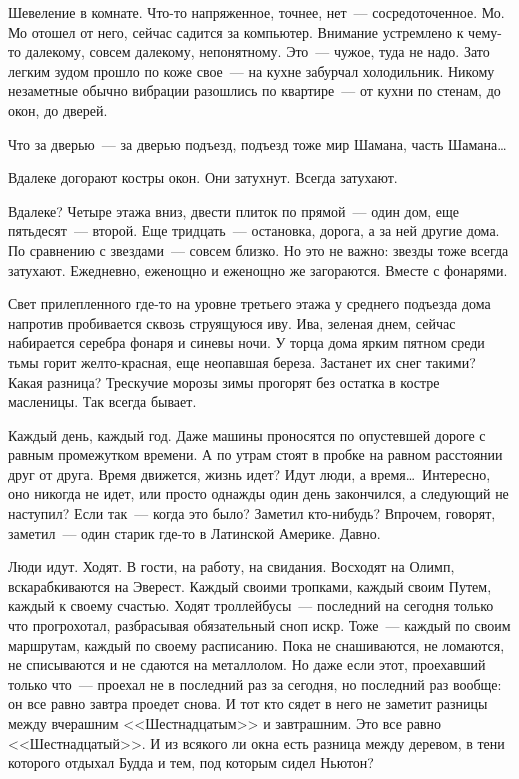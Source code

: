 Шевеление в комнате. Что-то напряженное, точнее, нет~--- сосредоточенное. Мо. 
Мо отошел от него, сейчас садится за компьютер. Внимание устремлено к чему-то 
далекому, совсем далекому, непонятному. Это~--- чужое, туда не надо. Зато 
легким зудом прошло по коже свое~--- на кухне забурчал холодильник. Никому незаметные 
обычно вибрации разошлись по квартире~--- от кухни по стенам, до окон, до 
дверей. 

Что за дверью~--- за дверью подъезд, подъезд тоже мир Шамана, часть Шамана\ldots

\newpage

Вдалеке догорают костры окон. Они затухнут. Всегда затухают.

Вдалеке? Четыре этажа вниз, двести плиток по прямой~--- один дом, еще 
пятьдесят~--- второй. Еще тридцать~--- остановка, дорога, а за ней другие дома. По сравнению 
с звездами~--- совсем близко. Но это не важно: звезды тоже всегда затухают. 
Ежедневно, еженощно и еженощно же загораются. Вместе с фонарями.

Свет прилепленного где-то на уровне третьего этажа у среднего подъезда дома 
напротив пробивается сквозь струящуюся иву. Ива, зеленая днем, сейчас 
набирается серебра фонаря и синевы ночи. У торца дома ярким пятном среди тьмы горит 
желто-красная, еще неопавшая береза. Застанет их снег такими? Какая разница? 
Трескучие морозы зимы прогорят без остатка в костре масленицы. Так всегда 
бывает.

Каждый день, каждый год. Даже машины проносятся по опустевшей дороге с равным 
промежутком времени. А по утрам стоят в пробке на равном расстоянии друг от 
друга. Время движется, жизнь идет? Идут люди, а время\ldots\ Интересно, оно 
никогда не идет, или просто однажды один день закончился, а следующий не наступил? Если 
так~--- когда это было? Заметил кто-нибудь? Впрочем, говорят, заметил~--- один 
старик где-то в Латинской Америке. Давно.

Люди идут. Ходят. В гости, на работу, на свидания. Восходят на Олимп, 
вскарабкиваются на Эверест. Каждый своими тропками, каждый своим Путем, каждый 
к своему счастью. Ходят троллейбусы~--- последний на сегодня только что 
прогрохотал, разбрасывая обязательный сноп искр. Тоже~--- каждый по своим маршрутам, каждый 
по своему расписанию. Пока не снашиваются, не ломаются, не списываются и не 
сдаются 
на металлолом. Но даже если этот, проехавший только что~--- проехал не в 
последний 
раз за сегодня, но последний раз вообще: он все равно завтра проедет снова. И 
тот кто сядет в него не заметит разницы между вчерашним <<Шестнадцатым>> и 
завтрашним. Это все равно <<Шестнадцатый>>. И из всякого ли окна есть разница 
между деревом, в тени которого отдыхал Будда и тем, под которым сидел Ньютон?

